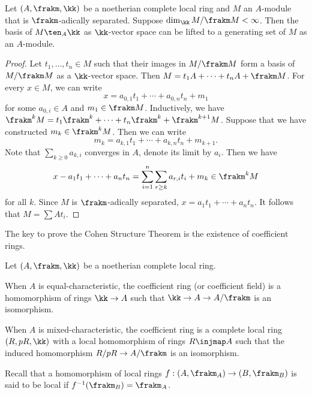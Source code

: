 
        \begin{proposition}\label{prop: Nakayama's Lemma for I-adically separated modules}
            Let \((A,\frakm,\kk)\) be a noetherian complete local ring and \(M\) an \(A\)-module that is \(\frakm\)-adically separated.
            Suppose \(\dim_\kk M/\frakm M < \infty\).
            Then the basis of \(M \ten_A \kk\) as \(\kk\)-vector space can be lifted to a generating set of \(M\) as an \(A\)-module.
        \end{proposition}
        \begin{proof}
            Let \(t_1,\ldots,t_n \in M\) such that their images in \(M/\frakm M\) form a basis of \(M/\frakm M\) as a \(\kk\)-vector space.
            Then \( M = t_1 A + \cdots + t_n A + \frakm M\).
            For every \(x \in M\), we can write 
            \[ x = a_{0,1}t_1 + \cdots + a_{0,n}t_n + m_1\] 
            for some \(a_{0,i} \in A\) and \(m_1 \in \frakm M\).
            Inductively, we have \(\frakm^k M = t_1 \frakm^k + \cdots + t_n \frakm^k + \frakm^{k+1} M\).
            Suppose that we have constructed \(m_k \in \frakm^k M\).
            Then we can write
            \[ m_k = a_{k,1}t_1 + \cdots + a_{k,n}t_n + m_{k+1}. \]
            Note that \(\sum_{k \geq 0} a_{k,i}\) converges in \(A\), denote its limit by \(a_i\).
            Then we have 
            \[x - a_1 t_1 + \cdots + a_n t_n = \sum_{i=1}^n\sum_{r \geq k} a_{r,i} t_i + m_{k} \in \frakm^kM\]
            for all \(k\).
            Since \(M\) is \(\frakm\)-adically separated, \(x = a_1 t_1 + \cdots + a_n t_n\).
            It follows that \(M = \sum A t_i\).
        \end{proof}

        The key to prove the Cohen Structure Theorem is the existence of coefficient rings.

        \begin{definition}\label{def: coefficient rings}
            Let \((A,\frakm,\kk)\) be a noetherian complete local ring.
            
            When \(A\) is equal-characteristic, the coefficient ring (or coefficient field) is a homomorphism of rings \(\kk \to A\) such that \(\kk \to A \to A/\frakm\) is an isomorphism.
            
            When \(A\) is mixed-characteristic, the coefficient ring is a complete local ring \((R,pR,\kk)\) with a local homomorphism of rings \(R \injmap A\) such that the induced homomorphism \(R/pR \to A/\frakm\) is an isomorphism.
        \end{definition}
        \begin{remark}
            Recall that a homomorphism of local rings \(f:(A,\frakm_A) \to (B,\frakm_B)\) is said to be local if \(f^{-1}(\frakm_B) = \frakm_A\).
        \end{remark}

